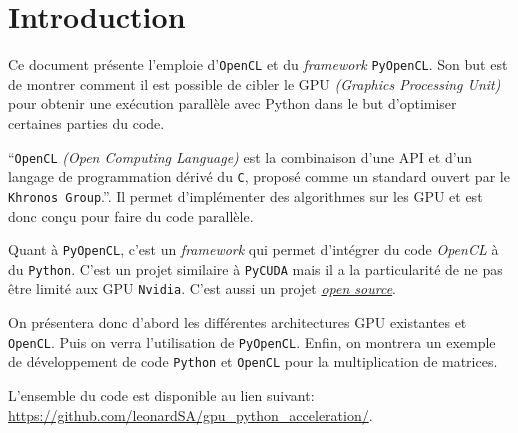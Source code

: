 \section{Introduction}

Ce document présente l'emploie d'\texttt{OpenCL} et du \textit{framework} 
\texttt{PyOpenCL}. Son but est de montrer comment il est possible de cibler
le GPU \textit{(Graphics Processing Unit)} pour obtenir une exécution parallèle 
avec Python dans le but d'optimiser certaines parties du code.

``\texttt{OpenCL} \textit{(Open Computing Language)} est la combinaison d’une API et d’un
langage de programmation dérivé du \texttt{C}, proposé comme un standard ouvert
par le \texttt{Khronos Group}.''\autocite{wikiopencl}. Il permet d'implémenter des 
algorithmes sur les GPU et est donc conçu pour faire du code parallèle.

Quant à \texttt{PyOpenCL}, 
c'est un \textit{framework} qui permet d'intégrer du code \textit{OpenCL} à
du \texttt{Python}. C'est un projet similaire à \texttt{PyCUDA} mais il a la 
particularité de ne pas être limité aux GPU \texttt{Nvidia}.
C'est aussi un projet 
\href{https://github.com/inducer/pyopencl}{\textit{open source}}.

On présentera donc d'abord les différentes architectures GPU existantes et \texttt{OpenCL}.
Puis on verra l'utilisation de \texttt{PyOpenCL}. Enfin, on montrera un exemple de développement 
de code \texttt{Python} et \texttt{OpenCL} pour la multiplication de matrices.

L'ensemble du code est disponible au lien suivant: \url{https://github.com/leonardSA/gpu\_python\_acceleration/}.
